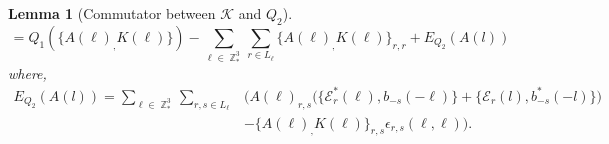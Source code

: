 \documentclass[sn-mathphys,Numbered, a4paper ,nocrop]{sn-jnl}%
\DeclareMathOperator{\Z}{\mathbb{Z}}
\theoremstyle{plain}
\newtheorem{lemma}[theorem]{Lemma}
\theoremstyle{definition}
\theoremstyle{remark}
\theoremstyle{plain}
\theoremstyle{definition}
\theoremstyle{remark}
\begin{document}
\begin{lemma}[Commutator between $\mathcal{K} $ and $Q_2$]\label{lem:Q2Kcomm}
\begin{equation}
    [ Q_2(A(\ell)),\mathcal{K}] = Q_1\left(\Big\{A(\ell)_
        ,K(\ell)\Big\}\right)-\sum\limits_{\ell \in \Z^3_*}\sum\limits_{r \in L_{\ell}}\Big\{A(\ell)_
        ,K(\ell)\Big\}_{r,r} + E_{Q_2}(A(l)) 
\end{equation}
 where,
\begin{align}
    E_{Q_2}(A(l)) =
        \sum\limits_{\ell \in \Z^3_*}\sum\limits_{r,s \in L_{\ell}}&\Big(A(\ell)_{r,s}\big(\big\{\mathcal{E}^*_{r}(\ell), b_{-s}(-\ell)\big\} + \big\{\mathcal{E}_r(l), b^*_{-s}(-l)\big\}\big)\nonumber\\&-\big\{A(\ell)_,K(\ell)\big\}_{r,s}\epsilon_{r,s}(\ell,\ell)\Big) . 
\end{align}
\end{lemma}
\end{document}
